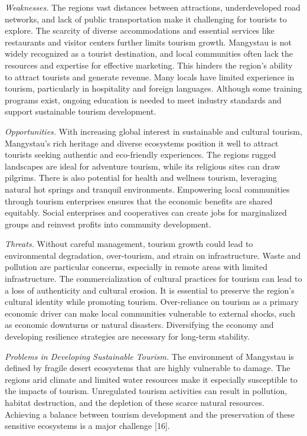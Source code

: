 \emph{Weaknesses.} The region\textquotesingle s vast distances between
attractions, underdeveloped road networks, and lack of public
transportation make it challenging for tourists to explore. The scarcity
of diverse accommodations and essential services like restaurants and
visitor centers further limits tourism growth. Mangystau is not widely
recognized as a tourist destination, and local communities often lack
the resources and expertise for effective marketing. This hinders the
region's ability to attract tourists and generate revenue. Many locals
have limited experience in tourism, particularly in hospitality and
foreign languages. Although some training programs exist, ongoing
education is needed to meet industry standards and support sustainable
tourism development.

\emph{Opportunities.} With increasing global interest in sustainable and
cultural tourism, Mangystau's rich heritage and diverse ecosystems
position it well to attract tourists seeking authentic and eco-friendly
experiences. The region\textquotesingle s rugged landscapes are ideal
for adventure tourism, while its religious sites can draw pilgrims.
There is also potential for health and wellness tourism, leveraging
natural hot springs and tranquil environments. Empowering local
communities through tourism enterprises ensures that the economic
benefits are shared equitably. Social enterprises and cooperatives can
create jobs for marginalized groups and reinvest profits into community
development.

\emph{Threats.} Without careful management, tourism growth could lead to
environmental degradation, over-tourism, and strain on infrastructure.
Waste and pollution are particular concerns, especially in remote areas
with limited infrastructure. The commercialization of cultural practices
for tourism can lead to a loss of authenticity and cultural erosion. It
is essential to preserve the region's cultural identity while promoting
tourism. Over-reliance on tourism as a primary economic driver can make
local communities vulnerable to external shocks, such as economic
downturns or natural disasters. Diversifying the economy and developing
resilience strategies are necessary for long-term stability.

\emph{Problems in Developing Sustainable Tourism.} The environment of
Mangystau is defined by fragile desert ecosystems that are highly
vulnerable to damage. The region\textquotesingle s arid climate and
limited water resources make it especially susceptible to the impacts of
tourism. Unregulated tourism activities can result in pollution, habitat
destruction, and the depletion of these scarce natural resources.
Achieving a balance between tourism development and the preservation of
these sensitive ecosystems is a major challenge {[}16{]}.

